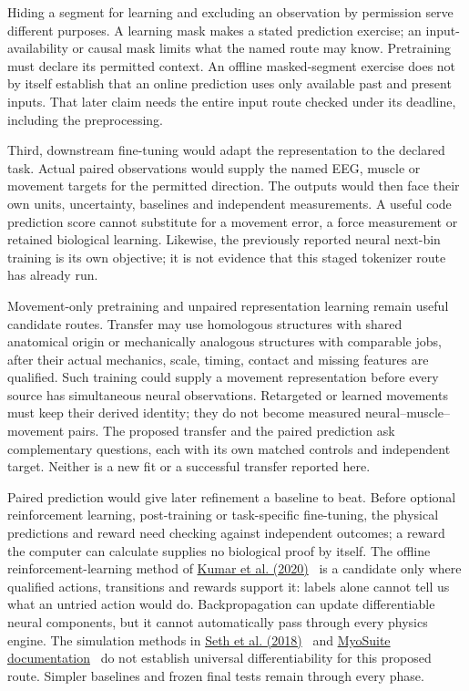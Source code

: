 Hiding a segment for learning and excluding an observation by permission serve
different purposes. A learning mask makes a stated prediction exercise; an
input-availability or causal mask limits what the named route may know.
Pretraining must declare its permitted context. An offline masked-segment
exercise does not by itself establish that an online prediction uses only
available past and present inputs. That later claim needs the entire input
route checked under its deadline, including the preprocessing.

Third, downstream fine-tuning would adapt the representation to the declared
task. Actual paired observations would supply the named EEG, muscle or movement
targets for the permitted direction. The outputs would then face their own
units, uncertainty, baselines and independent measurements. A useful code
prediction score cannot substitute for a movement error, a force measurement
or retained biological learning. Likewise, the previously reported neural
next-bin training is its own objective; it is not evidence that this staged
tokenizer route has already run.

Movement-only pretraining and unpaired representation learning remain useful
candidate routes. Transfer may use homologous structures with shared anatomical
origin or mechanically analogous structures with comparable jobs, after their
actual mechanics, scale, timing, contact and missing features are qualified.
Such training could supply a movement representation before every source has
simultaneous neural observations. Retargeted or learned movements must keep
their derived identity; they do not become measured neural--muscle--movement
pairs. The proposed transfer and the paired prediction ask complementary
questions, each with its own matched controls and independent target. Neither
is a new fit or a successful transfer reported here.

Paired prediction would give later refinement a baseline to beat. Before
optional reinforcement learning, post-training or task-specific fine-tuning,
the physical predictions and reward need checking against independent
outcomes; a reward the computer can calculate supplies no biological proof
by itself. The offline reinforcement-learning method of \href{https://arxiv.org/abs/2006.04779v3}{Kumar et al. (2020)}~\cite{cql2020} is a
candidate only where qualified actions, transitions and rewards support it: labels alone cannot tell us what an untried action
would do. Backpropagation can update differentiable neural components, but
it cannot automatically pass through every physics engine. The simulation
methods in \href{https://journals.plos.org/ploscompbiol/article?id=10.1371/journal.pcbi.1006223}{Seth et al. (2018)}~\cite{opensim2018} and \href{https://myosuite.readthedocs.io/en/latest/}{MyoSuite documentation}~\cite{myosuiteDocsUndated} do not establish
universal differentiability for this proposed route. Simpler baselines and frozen final
tests remain through every phase.


